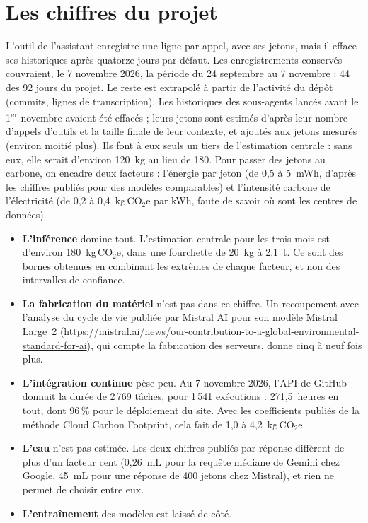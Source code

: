 \section{Les chiffres du projet}

L'outil de l'assistant enregistre une ligne par appel, avec ses jetons, mais il efface ses
historiques après quatorze jours par défaut. Les enregistrements conservés couvraient, le
7 novembre 2026, la période du 24 septembre au 7 novembre : 44 des 92 jours du projet. Le
reste est extrapolé à partir de l'activité du dépôt (commits, lignes de transcription).
Les historiques des sous-agents lancés avant le 1\textsuperscript{er} novembre avaient été
effacés ; leurs jetons sont estimés d'après leur nombre d'appels d'outils et la taille
finale de leur contexte, et ajoutés aux jetons mesurés (environ moitié plus). Ils font à
eux seuls un tiers de l'estimation centrale : sans eux, elle serait d'environ 120~kg au
lieu de 180.
Pour passer des jetons au carbone, on encadre deux facteurs : l'énergie par jeton (de 0,5
à 5~mWh, d'après les chiffres publiés pour des modèles comparables) et l'intensité carbone
de l'électricité (de 0,2 à 0,4~kg\,CO$_2$e par kWh, faute de savoir où sont les centres
de données).

\begin{itemize}
  \item \textbf{L'inférence} domine tout. L'estimation centrale pour les trois mois est
        d'environ 180~kg\,CO$_2$e, dans une fourchette de 20~kg à 2,1~t. Ce sont des bornes
        obtenues en combinant les extrêmes de chaque facteur, et non des intervalles de
        confiance.
  \item \textbf{La fabrication du matériel} n'est pas dans ce chiffre. Un recoupement avec
        l'analyse du cycle de vie publiée par Mistral AI pour son modèle Mistral Large~2
        (\url{https://mistral.ai/news/our-contribution-to-a-global-environmental-standard-for-ai}),
        qui compte la fabrication des serveurs, donne cinq à neuf fois plus.
  \item \textbf{L'intégration continue} pèse peu. Au 7 novembre 2026, l'API de GitHub
        donnait la durée de 2\,769 tâches, pour 1\,541 exécutions : 271,5~heures en tout,
        dont 96\,\% pour le déploiement du site. Avec les coefficients publiés de la
        méthode Cloud Carbon Footprint, cela fait de 1,0 à 4,2~kg\,CO$_2$e.
  \item \textbf{L'eau} n'est pas estimée. Les deux chiffres publiés par réponse diffèrent de
        plus d'un facteur cent (0,26~mL pour la requête médiane de Gemini chez Google,
        45~mL pour une réponse de 400 jetons chez Mistral), et rien ne permet de choisir
        entre eux.
  \item \textbf{L'entraînement} des modèles est laissé de côté.
\end{itemize}

